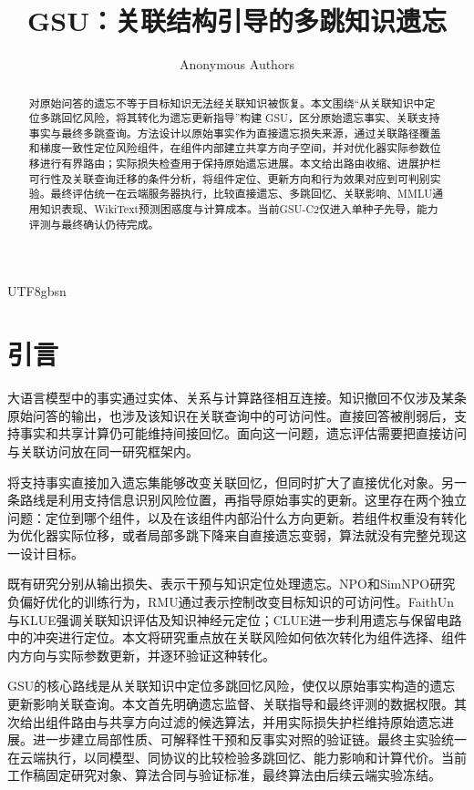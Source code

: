 \documentclass[sigconf,anonymous,review]{acmart}
\title[GSU]{GSU：关联结构引导的多跳知识遗忘}
\author{Anonymous Authors}
\begin{document}
\begin{CJK*}{UTF8}{gbsn}
\begin{abstract}
对原始问答的遗忘不等于目标知识无法经关联知识被恢复。本文围绕“从关联知识中定位多跳回忆风险，将其转化为遗忘更新指导”构建 GSU，区分原始遗忘事实、关联支持事实与最终多跳查询。方法设计以原始事实作为直接遗忘损失来源，通过关联路径覆盖和梯度一致性定位风险组件，在组件内部建立共享方向子空间，并对优化器实际参数位移进行有界路由；实际损失检查用于保持原始遗忘进展。本文给出路由收缩、进展护栏可行性及关联查询迁移的条件分析，将组件定位、更新方向和行为效果对应到可判别实验。最终评估统一在云端服务器执行，比较直接遗忘、多跳回忆、关联影响、MMLU通用知识表现、WikiText预测困惑度与计算成本。当前GSU-C2仅进入单种子先导，能力评测与最终确认仍待完成。
\end{abstract}
\maketitle

\section{引言}
大语言模型中的事实通过实体、关系与计算路径相互连接。知识撤回不仅涉及某条原始问答的输出，也涉及该知识在关联查询中的可访问性。直接回答被削弱后，支持事实和共享计算仍可能维持间接回忆。面向这一问题，遗忘评估需要把直接访问与关联访问放在同一研究框架内。

将支持事实直接加入遗忘集能够改变关联回忆，但同时扩大了直接优化对象。另一条路线是利用支持信息识别风险位置，再指导原始事实的更新。这里存在两个独立问题：定位到哪个组件，以及在该组件内部沿什么方向更新。若组件权重没有转化为优化器实际位移，或者局部多跳下降来自直接遗忘变弱，算法就没有完整兑现这一设计目标。

既有研究分别从输出损失、表示干预与知识定位处理遗忘。NPO和SimNPO研究负偏好优化的训练行为\cite{npo,simnpo}，RMU通过表示控制改变目标知识的可访问性\cite{wmdp}。FaithUn与KLUE强调关联知识评估及知识神经元定位\cite{faithun}；CLUE进一步利用遗忘与保留电路中的冲突进行定位\cite{clue}。本文将研究重点放在关联风险如何依次转化为组件选择、组件内方向与实际参数更新，并逐环验证这种转化。

GSU的核心路线是从关联知识中定位多跳回忆风险，使仅以原始事实构造的遗忘更新影响关联查询。本文首先明确遗忘监督、关联指导和最终评测的数据权限。其次给出组件路由与共享方向过滤的候选算法，并用实际损失护栏维持原始遗忘进展。进一步建立局部性质、可解释性干预和反事实对照的验证链。最终主实验统一在云端执行，以同模型、同协议的比较检验多跳回忆、能力影响和计算代价。当前工作稿固定研究对象、算法合同与验证标准，最终算法由后续云端实验冻结。


\end{CJK*}
\end{document}
